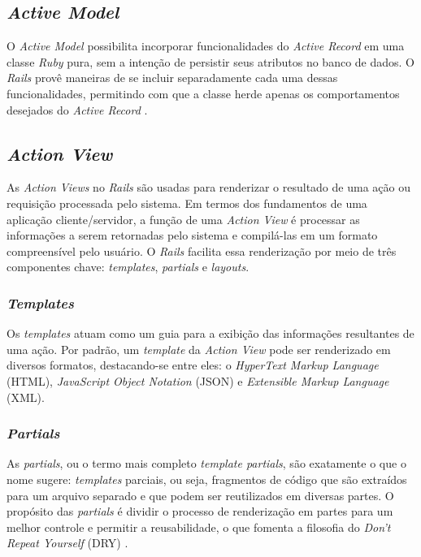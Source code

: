 \subsection{\textit{Active Model}}

O \textit{Active Model} possibilita incorporar funcionalidades do \textit{Active Record} em uma classe \textit{Ruby} pura, sem a intenção de persistir seus atributos no banco de dados. O \textit{Rails} provê maneiras de se incluir separadamente cada uma dessas funcionalidades, permitindo com que a classe herde apenas os comportamentos desejados do \textit{Active Record} \cite{activemodel-basics}.

\subsection{\textit{Action View}}

As \textit{Action Views} no \textit{Rails} são usadas para renderizar o resultado de uma ação ou requisição processada pelo sistema. Em termos dos fundamentos de uma aplicação cliente/servidor, a função de uma \textit{Action View} é processar as informações a serem retornadas pelo sistema e compilá-las em um formato compreensível pelo usuário. O \textit{Rails} facilita essa renderização por meio de três componentes chave: \textit{templates}, \textit{partials} e \textit{layouts}.

\subsubsection{\textit{Templates}}

Os \textit{templates} atuam como um guia para a exibição das informações resultantes de uma ação. Por padrão, um \textit{template} da \textit{Action View} pode ser renderizado em diversos formatos, destacando-se entre eles: o \textit{HyperText Markup Language} (HTML), \textit{JavaScript Object Notation} (JSON) e \textit{Extensible Markup Language} (XML).

\subsubsection{\textit{Partials}}

As \textit{partials}, ou o termo mais completo \textit{template partials}, são exatamente o que o nome sugere: \textit{templates} parciais, ou seja, fragmentos de código que são extraídos para um arquivo separado e que podem ser reutilizados em diversas partes. O propósito das \textit{partials} é dividir o processo de renderização em partes para um melhor controle e permitir a reusabilidade, o que fomenta a filosofia do \textit{Don't Repeat Yourself} (DRY) \cite{actionview-overview}.

